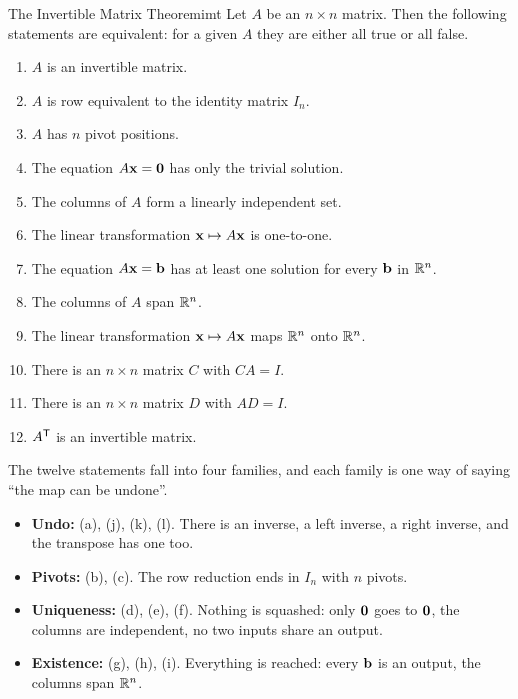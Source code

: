 \documentclass[11pt]{article}
\begin{document}
\begin{thm}{The Invertible Matrix Theorem}{imt}
Let $A$ be an $n\times n$ matrix. Then the following statements are equivalent: for a given $A$ they are either all true or all false.
\begin{enumerate}[label=(\alph*),itemsep=1pt]
  \item $A$ is an invertible matrix.
  \item $A$ is row equivalent to the identity matrix $I_n$.
  \item $A$ has $n$ pivot positions.
  \item The equation $A\mathbf{x}=\mathbf{0}$ has only the trivial solution.
  \item The columns of $A$ form a linearly independent set.
  \item The linear transformation $\mathbf{x}\mapsto A\mathbf{x}$ is one-to-one.
  \item The equation $A\mathbf{x}=\mathbf{b}$ has at least one solution for every $\mathbf{b}$ in $\mathbb{R}^n$.
  \item The columns of $A$ span $\mathbb{R}^n$.
  \item The linear transformation $\mathbf{x}\mapsto A\mathbf{x}$ maps $\mathbb{R}^n$ onto $\mathbb{R}^n$.
  \item There is an $n\times n$ matrix $C$ with $CA=I$.
  \item There is an $n\times n$ matrix $D$ with $AD=I$.
  \item $A^{\mathsf T}$ is an invertible matrix.
\end{enumerate}
\end{thm}

The twelve statements fall into four families, and each family is one way of saying ``the map can be undone''.
\begin{itemize}
  \item \textbf{Undo:} (a), (j), (k), (l). There is an inverse, a left inverse, a right inverse, and the transpose has one too.
  \item \textbf{Pivots:} (b), (c). The row reduction ends in $I_n$ with $n$ pivots.
  \item \textbf{Uniqueness:} (d), (e), (f). Nothing is squashed: only $\mathbf{0}$ goes to $\mathbf{0}$, the columns are independent, no two inputs share an output.
  \item \textbf{Existence:} (g), (h), (i). Everything is reached: every $\mathbf{b}$ is an output, the columns span $\mathbb{R}^n$.
\end{itemize}
\end{document}
